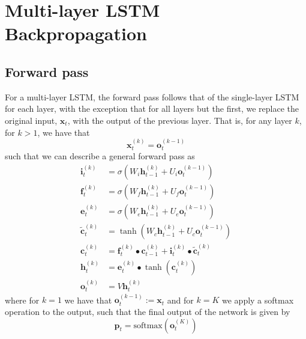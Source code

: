 \documentclass{article}
\begin{document}
\newpage
\section*{Multi-layer LSTM Backpropagation}
\subsection*{Forward pass}
	For a multi-layer LSTM, the forward pass follows that of the single-layer LSTM for each layer, with the exception that for all layers but the first, we replace the original input, $\bm{x}_t$, with the output of the previous layer. That is, for any layer $k$, for $k > 1$, we have that
	$$\bm{x}_t^{(k)} = \bm{o}_t^{(k-1)}$$
	such that we can describe a general forward pass as
	\begin{align*}
		\bm{i}_t^{(k)} &= \sigma(W_i \bm{h}_{t-1}^{(k)} + U_i\bm{o}_t^{(k-1)}) \\
		\bm{f}_t^{(k)} &= \sigma(W_f \bm{h}_{t-1}^{(k)} + U_f\bm{o}_t^{(k-1)}) \\
		\bm{e}_t^{(k)} &= \sigma(W_e \bm{h}_{t-1}^{(k)} + U_e\bm{o}_t^{(k-1)}) \\
		\tilde{\bm{c}}_t^{(k)} &= \tanh(W_c\bm{h}_{t-1}^{(k)} + U_c\bm{o}_t^{(k-1)}) \\
		\bm{c}_t^{(k)} &= \bm{f}_t^{(k)} \bullet \bm{c}_{t-1}^{(k)} + \bm{i}_t^{(k)} \bullet \tilde{\bm{c}}_t^{(k)} \\
		\bm{h}_t^{(k)} &= \bm{e}_t^{(k)} \bullet \tanh(\bm{c}_t^{(k)})\\
		\bm{o}_t^{(k)} &= V \bm{h}_t^{(k)}
	\end{align*}
	where for $k = 1$ we have that $\bm{o}_t^{(k-1)} := \bm{x}_t$ and for $k = K$ we apply a softmax operation to the output, such that the final output of the network is given by
	$$\bm{p}_t = \text{softmax}(\bm{o}_t^{(K)})$$
\end{document}
